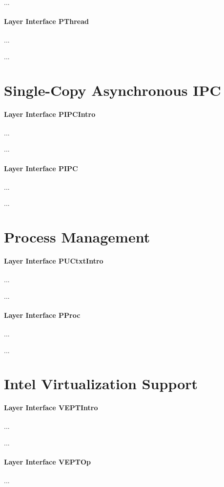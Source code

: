 ...

\paragraph{Layer Interface PThread}
...

...

\section{Single-Copy Asynchronous IPC}

\paragraph{Layer Interface PIPCIntro}
...

...

\paragraph{Layer Interface PIPC}
...

...

\section{Process Management}

\paragraph{Layer Interface PUCtxtIntro}
...

...

\paragraph{Layer Interface PProc}
...

...

\section{Intel Virtualization Support}

\paragraph{Layer Interface VEPTIntro}
...

...

\paragraph{Layer Interface VEPTOp}
...

